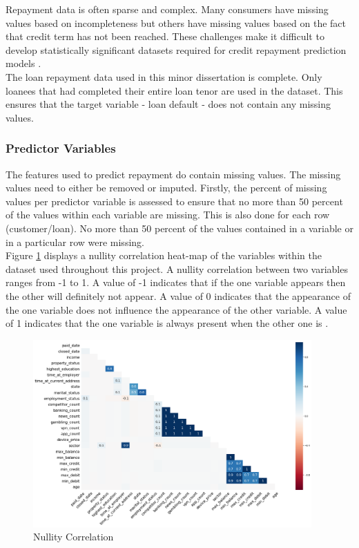 Repayment data is often sparse and complex. Many consumers have missing values based on incompleteness but others have missing values based on the fact that credit term has not been reached. These challenges make it difficult to develop statistically significant datasets required for credit repayment prediction models \parencite{MissingValuesCR}. \\ 

The loan repayment data used in this minor dissertation is complete. Only loanees that had completed their entire loan tenor are used in the dataset. This ensures that the target variable - loan default - does not contain any missing values.

\subsubsection{Predictor Variables}

The features used to predict repayment do contain missing values. The missing values need to either be removed or imputed. Firstly, the percent of missing values per predictor variable is assessed to ensure that no more than 50 percent of the values within each variable are missing. This is also done for each row (customer/loan). No more than 50 percent of the values contained in a variable or in a particular row were missing. \\

Figure \ref{fig:nullity} displays a nullity correlation heat-map of the variables within the dataset used throughout this project. A nullity correlation between two variables ranges from -1 to 1. A value of -1 indicates that if the one variable appears then the other will definitely not appear. A value of 0 indicates that the  appearance of the one variable does not influence the appearance of the other variable. A value of 1 indicates that the one variable is always present when the other one is \parencite{nullity}.  \\

\vspace{10pt}

\begin{figure}[!htb]
\centering
\includegraphics[width=0.95\textwidth]{images/nutility_correlation.png}
\caption{Nullity Correlation}
\label{fig:nullity}
\end{figure}

